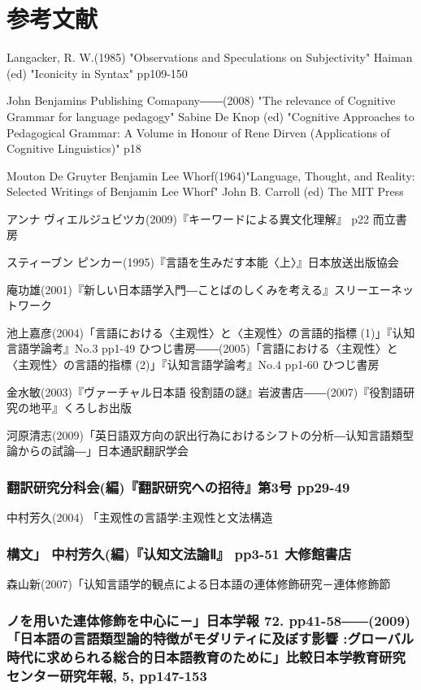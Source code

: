 \section{参考文献}
Langacker, R. W.(1985) "Observations and Speculations on Subjectivity" 
Haiman (ed) "Iconicity in Syntax" pp109-150

John Benjamins Publishing Comapany――(2008) "The relevance of Cognitive Grammar for language pedagogy" 
Sabine De Knop (ed) "Cognitive Approaches to Pedagogical Grammar: A Volume in Honour of Rene Dirven 
(Applications of Cognitive Linguistics)" p18 

Mouton De Gruyter Benjamin Lee Whorf(1964)"Language, Thought, and Reality: Selected Writings of Benjamin Lee Whorf" 
John B. Carroll (ed) The MIT Press

アンナ ヴィエルジュビツカ(2009)『キーワードによる異文化理解』 p22 而立書房

スティーブン ピンカー(1995)『言語を生みだす本能〈上〉』日本放送出版協会

庵功雄(2001)『新しい日本語学入門―ことばのしくみを考える』スリーエーネットワーク

池上嘉彦(2004)「言語における〈主观性〉と〈主观性〉の言語的指標 (1)」『认知言語学論考』No.3 pp1-49 ひつじ書房――(2005)「言語における〈主观性〉と〈主观性〉の言語的指標 (2)」『认知言語学論考』No.4 pp1-60 ひつじ書房

金水敏(2003)『ヴァーチャル日本語 役割語の謎』岩波書店――(2007)『役割語研究の地平』くろしお出版

河原清志(2009)「英日語双方向の訳出行為におけるシフトの分析―认知言語類型論からの試論―」日本通訳翻訳学会\subsubsection{翻訳研究分科会(編)『翻訳研究への招待』第3号 pp29-49}

中村芳久(2004) 「主观性の言語学:主观性と文法構造\subsubsection{構文」 中村芳久(編)『认知文法論Ⅱ』 pp3-51 大修館書店}

森山新(2007)「认知言語学的観点による日本語の連体修飾研究－連体修飾節\subsubsection{ノを用いた連体修飾を中心に－」日本学報 72. pp41-58――(2009)「日本語の言語類型論的特徴がモダリティに及ぼす影響 :グローバル時代に求められる総合的日本語教育のために」比較日本学教育研究センター研究年報, 5, pp147-153}
